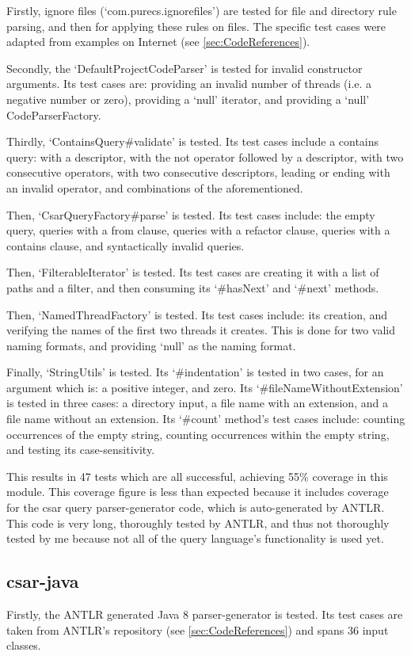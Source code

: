 \documentclass[12pt, letterpaper]{article}
\begin{document}
Firstly, ignore files (`com.purecs.ignorefiles') are tested for file and directory rule parsing, and then for applying these rules on files.
The specific test cases were adapted from examples on Internet (see \ref{sec:CodeReferences}).

Secondly, the `DefaultProjectCodeParser' is tested for invalid constructor arguments.
Its test cases are: providing an invalid number of threads (i.e. a negative number or zero), providing a `null' iterator, and providing a `null' CodeParserFactory.

Thirdly, `ContainsQuery\#validate' is tested.
Its test cases include a contains query: with a descriptor, with the not operator followed by a descriptor, with two consecutive operators, with two consecutive descriptors, leading or ending with an invalid operator, and combinations of the aforementioned.

Then, `CsarQueryFactory\#parse' is tested.
Its test cases include: the empty query, queries with a from clause, queries with a refactor clause, queries with a contains clause, and syntactically invalid queries.

Then, `FilterableIterator' is tested.
Its test cases are creating it with a list of paths and a filter, and then consuming its `\#hasNext' and `\#next' methods.

Then, `NamedThreadFactory' is tested.
Its test cases include: its creation, and verifying the names of the first two threads it creates.
This is done for two valid naming formats, and providing `null' as the naming format.

Finally, `StringUtils' is tested.
Its `\#indentation' is tested in two cases, for an argument which is: a positive integer, and zero.
Its `\#fileNameWithoutExtension' is tested in three cases: a directory input, a file name with an extension, and a file name without an extension.
Its `\#count' method's test cases include: counting occurrences of the empty string, counting occurrences within the empty string, and testing its case-sensitivity.

This results in 47 tests which are all successful, achieving 55\% coverage in this module.
This coverage figure is less than expected because it includes coverage for the csar query parser-generator code, which is auto-generated by ANTLR.
This code is very long, thoroughly tested by ANTLR, and thus not thoroughly tested by me because not all of the query language's functionality is used yet.

\subsection{csar-java}
Firstly, the ANTLR generated Java 8 parser-generator is tested.
Its test cases are taken from ANTLR's repository (see \ref{sec:CodeReferences}) and spans 36 input classes.
\end{document}
